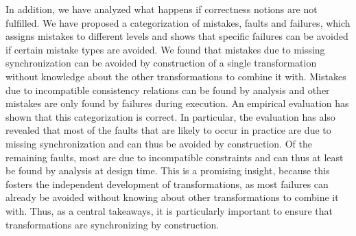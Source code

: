 In addition, we have analyzed what happens if correctness notions are not fulfilled.
We have proposed a categorization of mistakes, faults and failures, which assigns mistakes to different levels and shows that specific failures can be avoided if certain mistake types are avoided.
We found that mistakes due to missing synchronization can be avoided by construction of a single transformation without knowledge about the other transformations to combine it with.
Mistakes due to incompatible consistency relations can be found by analysis and other mistakes are only found by failures during execution.
An empirical evaluation has shown that this categorization is correct.
In particular, the evaluation has also revealed that most of the faults that are likely to occur in practice are due to missing synchronization and can thus be avoided by construction.
Of the remaining faults, most are due to incompatible constraints and can thus at least be found by analysis at design time.
This is a promising insight, because this fosters the independent development of transformations, as most failures can already be avoided without knowing about other transformations to combine it with.
Thus, as a central takeaways, it is particularly important to ensure that transformations are synchronizing by construction.

